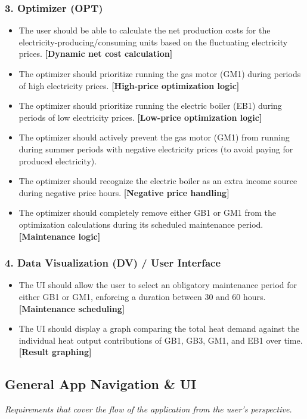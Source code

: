 \subsubsection*{3. Optimizer (OPT)}
\begin{itemize}
    \item The user should be able to calculate the net production costs for the electricity-producing/consuming units based on the fluctuating electricity prices. \textbf{[Dynamic net cost calculation]}
    \item The optimizer should prioritize running the gas motor (GM1) during periods of high electricity prices. \textbf{[High-price optimization logic]}
    \item The optimizer should prioritize running the electric boiler (EB1) during periods of low electricity prices. \textbf{[Low-price optimization logic]}
    \item The optimizer should actively prevent the gas motor (GM1) from running during summer periods with negative electricity prices (to avoid paying for produced electricity).
    \item The optimizer should recognize the electric boiler as an extra income source during negative price hours. \textbf{[Negative price handling]}
    \item The optimizer should completely remove either GB1 or GM1 from the optimization calculations during its scheduled maintenance period. \textbf{[Maintenance logic]}
\end{itemize}

\subsubsection*{4. Data Visualization (DV) / User Interface}
\begin{itemize}
    \item The UI should allow the user to select an obligatory maintenance period for either GB1 or GM1, enforcing a duration between 30 and 60 hours. \textbf{[Maintenance scheduling]}
    \item The UI should display a graph comparing the total heat demand against the individual heat output contributions of GB1, GB3, GM1, and EB1 over time. \textbf{[Result graphing]}
\end{itemize}

\subsection*{General App Navigation \& UI}
\textit{Requirements that cover the flow of the application from the user's perspective.}

